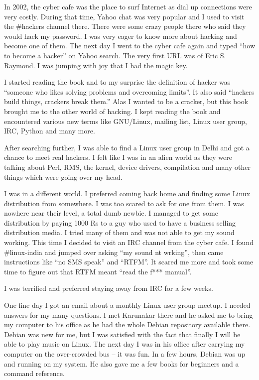 

\noindent{}In 2002, the cyber cafe was the place to surf Internet as dial up connections
were very costly. During that time, Yahoo chat was very popular and I used to
visit the \#hackers channel there. There were some crazy people there who said they
would hack my password. I was very eager to know more about hacking and become
one of them. The next day I went to the cyber cafe again and typed ``how to become a
hacker'' on Yahoo search. The very first URL was of Eric S. Raymond. I was jumping
with joy that I had the magic key.
 
I started reading the book and to my surprise the definition of hacker was
``someone who likes solving problems and overcoming limits''. It also said
``hackers build things, crackers break them.'' Alas I wanted to be a cracker, but
this book brought me to the other world of hacking. I kept reading the book and
encountered various new terms like GNU/Linux, mailing list, Linux user group,
IRC, Python and many more. 

After searching further, I was able to find a Linux user group in
Delhi and got a chance to meet real hackers. I felt like I was in an
alien world as they were talking about Perl, RMS, the kernel, device
drivers, compilation and many other things which were going over my
head.

I was in a different world. I preferred coming back home and finding some
Linux distribution from somewhere. I was too scared to ask for one
from them. I was nowhere near their level, a total dumb newbie. I managed to get some
distribution by paying 1000 Rs to a guy who used to have a business
selling distribution media. I tried many of them and was not able to
get my sound working. This time I decided to visit an IRC channel from
the cyber cafe. I found \#linux-india and jumped over asking ``my sound
nt wrking'', then came instructions like ``no SMS speak'' and ``RTFM''. It
scared me more and took some time to figure out that RTFM meant ``read the
f*** manual''.

I was terrified and preferred staying away from IRC for a few weeks.

One fine day I got an email about a monthly Linux user group meetup. I
needed answers for my many questions. I met Karunakar there and he
asked me to bring my computer to his office as he had the whole Debian
repository available there. Debian was new for me, but I was
satisfied with the fact that finally I will be able to play music on
Linux. The next day I was in his office after carrying my computer on the
over-crowded bus -- it was fun. In a few hours, Debian was up and running on my
system. He also gave me a few books for beginners and a command reference.


